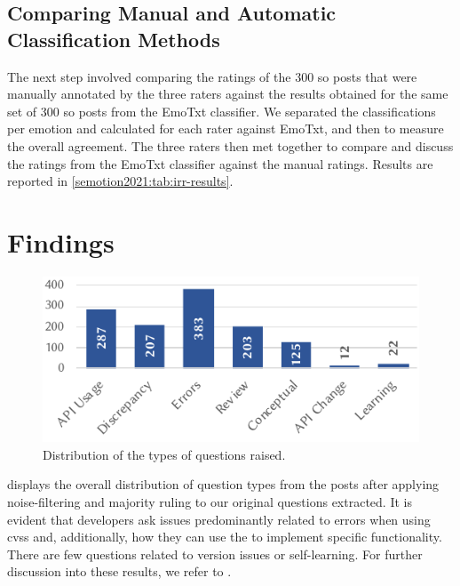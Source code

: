 \subsection{Comparing Manual and Automatic Classification Methods}

The next step involved comparing the ratings of the 300 \gls{so} posts that were manually annotated by the three raters against the results obtained for the same set of 300 \gls{so} posts from the EmoTxt classifier.
We separated the classifications per emotion and calculated \cohen{} for each rater against EmoTxt, and then \light{} to measure the overall agreement. The three raters then met together to compare and discuss the ratings from the EmoTxt classifier against the manual ratings. Results are reported in \cref{semotion2021:tab:irr-results}.

\section{Findings}\label{semotion2021:sec:findings}

\begin{figure}[t]
\centering
\includegraphics[width=.6\linewidth]{beyerclass}
\caption{Distribution of the types of questions raised.}
\label{semotion2021:fig:beyer-classifications}
\end{figure}

 displays the overall distribution of question types from the \SEMNumTotalNonNoisePosts{} posts after applying noise-filtering and majority ruling to our original \SEMNumTotalPostsFromSO{} questions extracted. It is evident that developers ask issues predominantly related to  errors when using \glspl{cvs} and, additionally, how they can use the  to implement specific functionality. There are few questions related to version issues or self-learning. For further discussion into these results, we refer to \citep{Cummaudo:2020icse}.

